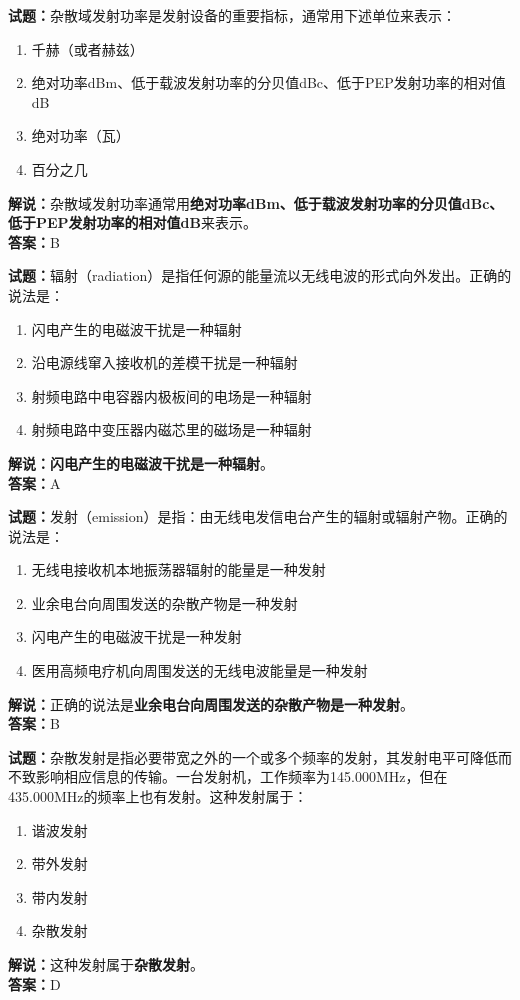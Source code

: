 \documentclass{ctexbook}
\begin{document}
\bigskip


\noindent\textbf{试题：}杂散域发射功率是发射设备的重要指标，通常用下述单位来表示：
\begin{enumerate}[leftmargin=3em]
	\item 千赫（或者赫兹）
	\item 绝对功率dBm、低于载波发射功率的分贝值dBc、低于PEP发射功率的相对值dB
	\item 绝对功率（瓦）
	\item 百分之几
\end{enumerate}
\noindent\textbf{解说：}杂散域发射功率通常用\textbf{绝对功率dBm、低于载波发射功率的分贝值dBc、低于PEP发射功率的相对值dB}来表示。\\\noindent\textbf{答案：}B


\bigskip


\noindent\textbf{试题：}辐射（radiation）是指任何源的能量流以无线电波的形式向外发出。正确的说法是：
\begin{enumerate}[leftmargin=3em]
	\item 闪电产生的电磁波干扰是一种辐射
	\item 沿电源线窜入接收机的差模干扰是一种辐射
	\item 射频电路中电容器内极板间的电场是一种辐射
	\item 射频电路中变压器内磁芯里的磁场是一种辐射
\end{enumerate}
\textbf{解说：闪电产生的电磁波干扰是一种辐射}。\\\noindent\textbf{答案：}A



\bigskip


\noindent\textbf{试题：}发射（emission）是指：由无线电发信电台产生的辐射或辐射产物。正确的说法是：
\begin{enumerate}[leftmargin=3em]
	\item 无线电接收机本地振荡器辐射的能量是一种发射
	\item 业余电台向周围发送的杂散产物是一种发射
	\item 闪电产生的电磁波干扰是一种发射
	\item 医用高频电疗机向周围发送的无线电波能量是一种发射
\end{enumerate}
\noindent\textbf{解说：}正确的说法是\textbf{业余电台向周围发送的杂散产物是一种发射}。\\\noindent\textbf{答案：}B


\bigskip


\noindent\textbf{试题：}杂散发射是指必要带宽之外的一个或多个频率的发射，其发射电平可降低而不致影响相应信息的传输。一台发射机，工作频率为145.000MHz，但在435.000MHz的频率上也有发射。这种发射属于：
\begin{enumerate}[leftmargin=3em]
	\item 谐波发射
	\item 带外发射
	\item 带内发射
	\item 杂散发射
\end{enumerate}
\noindent\textbf{解说：}这种发射属于\textbf{杂散发射}。\\\noindent\textbf{答案：}D
\end{document}

